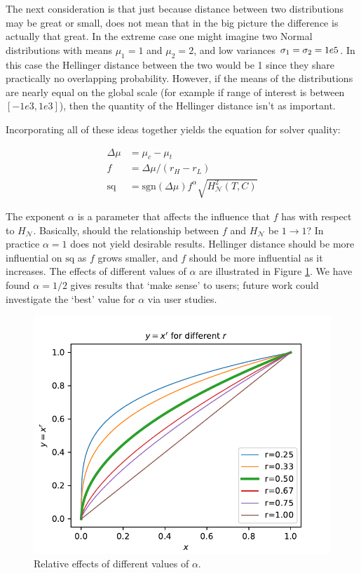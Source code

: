 The next consideration is that just because distance between two distributions may be great or small, does not mean that in the big picture the difference is actually that great. In the extreme case one might imagine two Normal distributions with means $\mu_1=1$ and $\mu_2=2$, and low variances $\sigma_1=\sigma_2=1e\-5$. In this case the Hellinger distance between the two would be 1 since they share practically no overlapping probability. However, if the means of the distributions are nearly equal on the global scale (for example if range of interest is between $[-1e3,1e3]$), then the quantity of the Hellinger distance isn't as important.

Incorporating all of these ideas together yields the equation for solver quality:

\begin{align}
    \Delta \mu &= \mu_c-\mu_t\\
    f &= \Delta \mu/(r_H-r_L) \label{eq:f}\\
    \text{sq} &= \text{sgn}(\Delta \mu)f^{\alpha}\sqrt{H_{\mathcal{N}}^{2}(T,C)} \label{eq:sq}
\end{align}

The exponent $\alpha$ is a parameter that affects the influence that $f$ has with respect to $H_{\mathcal{N}}$. Basically, should the relationship between $f$ and $H_{\mathcal{N}}$ be $1\to1$? In practice $\alpha=1$ does not yield desirable results. Hellinger distance should be more influential on $\text{sq}$ as $f$ grows smaller, and $f$ should be more influential as it increases. The effects of different values of $\alpha$ are illustrated in Figure \ref{fig:alphas}. We have found $\alpha=1/2$ gives results that `make sense' to users; future work could investigate the `best' value for $\alpha$ via user studies.

\begin{figure}[tbp]
    \centering
    \includegraphics[width=0.9\linewidth]{Figures/power_comparison}
    \caption{Relative effects of different values of $\alpha$.}
    \label{fig:alphas}
\end{figure}

